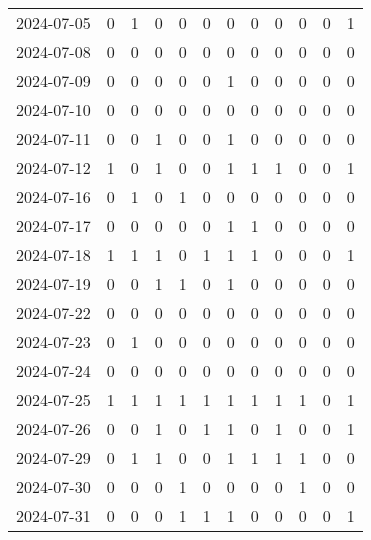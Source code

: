 \documentclass[dvipdfmx,oneside]{article}
\begin{document}
\begin{tabular}{lccccccccccc}
        2024-07-05 &     0 &     1 &     0 &     0 &     0 &     0 &     0 &     0 &     0 &     0 &     1 \\
        2024-07-08 &     0 &     0 &     0 &     0 &     0 &     0 &     0 &     0 &     0 &     0 &     0 \\
        2024-07-09 &     0 &     0 &     0 &     0 &     0 &     1 &     0 &     0 &     0 &     0 &     0 \\
        2024-07-10 &     0 &     0 &     0 &     0 &     0 &     0 &     0 &     0 &     0 &     0 &     0 \\
        2024-07-11 &     0 &     0 &     1 &     0 &     0 &     1 &     0 &     0 &     0 &     0 &     0 \\
        2024-07-12 &     1 &     0 &     1 &     0 &     0 &     1 &     1 &     1 &     0 &     0 &     1 \\
        2024-07-16 &     0 &     1 &     0 &     1 &     0 &     0 &     0 &     0 &     0 &     0 &     0 \\
        2024-07-17 &     0 &     0 &     0 &     0 &     0 &     1 &     1 &     0 &     0 &     0 &     0 \\
        2024-07-18 &     1 &     1 &     1 &     0 &     1 &     1 &     1 &     0 &     0 &     0 &     1 \\
        2024-07-19 &     0 &     0 &     1 &     1 &     0 &     1 &     0 &     0 &     0 &     0 &     0 \\
        2024-07-22 &     0 &     0 &     0 &     0 &     0 &     0 &     0 &     0 &     0 &     0 &     0 \\
        2024-07-23 &     0 &     1 &     0 &     0 &     0 &     0 &     0 &     0 &     0 &     0 &     0 \\
        2024-07-24 &     0 &     0 &     0 &     0 &     0 &     0 &     0 &     0 &     0 &     0 &     0 \\
        2024-07-25 &     1 &     1 &     1 &     1 &     1 &     1 &     1 &     1 &     1 &     0 &     1 \\
        2024-07-26 &     0 &     0 &     1 &     0 &     1 &     1 &     0 &     1 &     0 &     0 &     1 \\
        2024-07-29 &     0 &     1 &     1 &     0 &     0 &     1 &     1 &     1 &     1 &     0 &     0 \\
        2024-07-30 &     0 &     0 &     0 &     1 &     0 &     0 &     0 &     0 &     1 &     0 &     0 \\
        2024-07-31 &     0 &     0 &     0 &     1 &     1 &     1 &     0 &     0 &     0 &     0 &     1 \\

\end{tabular}
\end{document}
